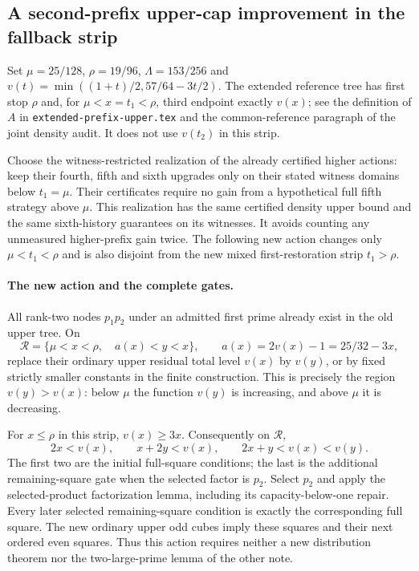 \subsection{A second-prefix upper-cap improvement in the fallback strip}
\label{sec:second-prefix-upper-fallback-20261009}

Set $\mu=25/128$, $\rho=19/96$, $\Lambda=153/256$ and
$v(t)=\min((1+t)/2,57/64-3t/2)$. The extended reference tree has
first stop $\rho$ and, for $\mu<x=t_1<\rho$, third endpoint exactly
$v(x)$; see the definition of $A$ in \texttt{extended-prefix-upper.tex}
and the common-reference paragraph of the joint density audit.
It does not use $v(t_2)$ in this strip.

Choose the witness-restricted realization of the already certified
higher actions: keep their fourth, fifth and sixth upgrades only on
their stated witness domains below $t_1=\mu$. Their certificates
require no gain from a hypothetical full fifth strategy above $\mu$.
This realization has the same certified density upper bound and the
same sixth-history guarantees on its witnesses. It avoids counting
any unmeasured higher-prefix gain twice. The following new action
changes only $\mu<t_1<\rho$ and is also disjoint from the new mixed
first-restoration strip $t_1>\rho$.

\paragraph{The new action and the complete gates.}
All rank-two nodes $p_1p_2$ under an admitted first prime already
exist in the old upper tree. On
\[
 \mathcal R=\{\mu<x<\rho,\quad a(x)<y<x\},\qquad
 a(x)=2v(x)-1=25/32-3x,
\]
replace their ordinary upper residual total level $v(x)$ by $v(y)$,
or by fixed strictly smaller constants in the finite construction.
This is precisely the region $v(y)>v(x)$: below $\mu$ the function
$v(y)$ is increasing, and above $\mu$ it is decreasing.

For $x\le\rho$ in this strip, $v(x)\ge3x$. Consequently on
$\mathcal R$,
\[
 2x< v(x),\qquad x+2y< v(x),\qquad
 2x+y< v(x)<v(y).
\]
The first two are the initial full-square conditions; the last is
the additional remaining-square gate when the selected factor is
$p_2$. Select $p_2$ and apply the selected-product factorization
lemma, including its capacity-below-one repair. Every later selected
remaining-square condition is exactly the corresponding full square.
The new ordinary upper odd cubes imply these squares and their next
ordered even squares. Thus this action requires neither a new
distribution theorem nor the two-large-prime lemma of the other note.


